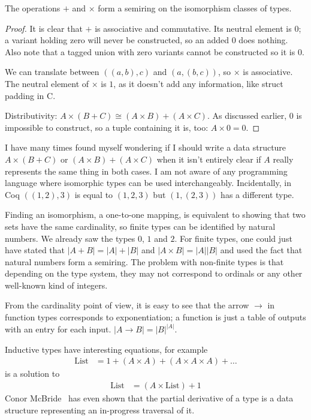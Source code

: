 \documentclass[english, 12pt, a4paper, sci, a-1b, online]{aaltothesis}
\begin{document}
\begin{theorem}
  The operations $+$ and $\times$ form a semiring on the isomorphism classes of types.
\end{theorem}

\begin{proof}
  It is clear that $+$ is associative and commutative. Its neutral element is $0$; a variant holding zero will never be constructed, so an added $0$ does nothing. Also note that a tagged union with zero variants cannot be constructed so it is $0$.

  We can translate between $((a, b), c)$ and $(a, (b, c))$, so $\times$ is associative. The neutral element of $\times$ is $1$, as it doesn't add any information, like struct padding in C.

  Distributivity: $A \times (B + C) \cong (A \times B) + (A \times C)$. As discussed earlier, $0$ is impossible to construct, so a tuple containing it is, too: $A \times 0 = 0$.
\end{proof}

I have many times found myself wondering if I should write a data structure $A \times (B + C)$ or $(A \times B) + (A \times C)$ when it isn't entirely clear if $A$ really represents the same thing in both cases. I am not aware of any programming language where isomorphic types can be used interchangeably. Incidentally, in Coq $((1, 2), 3)$ is equal to $(1, 2, 3)$ but $(1, (2, 3))$ has a different type.

Finding an isomorphism, a one-to-one mapping, is equivalent to showing that two sets have the same cardinality, so finite types can be identified by natural numbers. We already saw the types $0$, $1$ and $2$. For finite types, one could just have stated that $|A + B| = |A| + |B|$ and $|A \times B| = |A||B|$ and used the fact that natural numbers form a semiring. The problem with non-finite types is that depending on the type system, they may not correspond to ordinals or any other well-known kind of integers.

From the cardinality point of view, it is easy to see that the arrow $\to$ in function types corresponds to exponentiation; a function is just a table of outputs with an entry for each input. $|A \to B| = |B|^{|A|}$.

Inductive types have interesting equations, for example
\begin{align*}
  \text{List} &= 1 + (A \times A) + (A \times A \times A) + \ldots
\end{align*}
is a solution to
\begin{align*}
  \text{List} &= (A \times \text{List}) + 1
\end{align*}
Conor McBride~\cite{typeDerivative} has even shown that the partial derivative of a type is a data structure representing an in-progress traversal of it.
\end{document}
